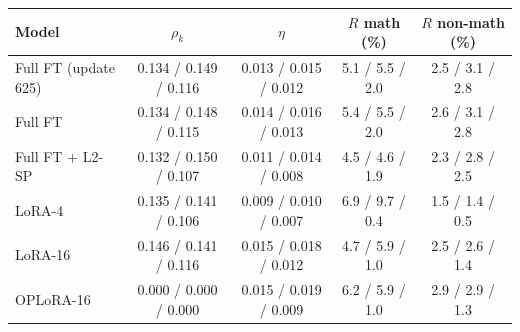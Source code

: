 \begin{tabular}{lcccc}\toprule Model & $\rho_k$ & $\eta$ & $R$ math (\%) & $R$ non-math (\%) \\ \midrule
Full FT (update 625) & 0.134 / 0.149 / 0.116 & 0.013 / 0.015 / 0.012 & 5.1 / 5.5 / 2.0 & 2.5 / 3.1 / 2.8 \\
Full FT & 0.134 / 0.148 / 0.115 & 0.014 / 0.016 / 0.013 & 5.4 / 5.5 / 2.0 & 2.6 / 3.1 / 2.8 \\
Full FT + L2-SP & 0.132 / 0.150 / 0.107 & 0.011 / 0.014 / 0.008 & 4.5 / 4.6 / 1.9 & 2.3 / 2.8 / 2.5 \\
LoRA-4 & 0.135 / 0.141 / 0.106 & 0.009 / 0.010 / 0.007 & 6.9 / 9.7 / 0.4 & 1.5 / 1.4 / 0.5 \\
LoRA-16 & 0.146 / 0.141 / 0.116 & 0.015 / 0.018 / 0.012 & 4.7 / 5.9 / 1.0 & 2.5 / 2.6 / 1.4 \\
OPLoRA-16 & 0.000 / 0.000 / 0.000 & 0.015 / 0.019 / 0.009 & 6.2 / 5.9 / 1.0 & 2.9 / 2.9 / 1.3 \\
\bottomrule\end{tabular}
